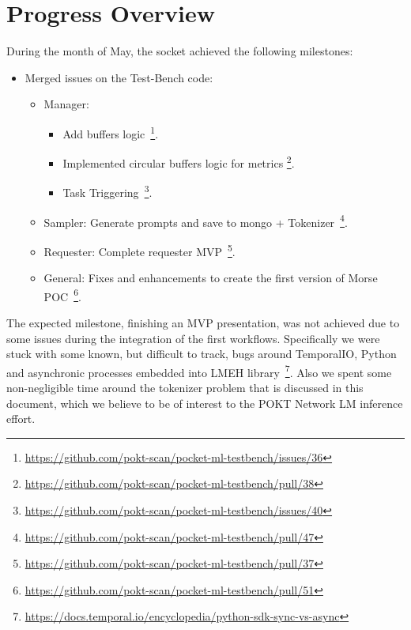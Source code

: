 \section{Progress Overview}\label{sec:a}

During the month of May, the socket achieved the following milestones:

\begin{itemize}\setlength\itemsep{2mm}
    \item Merged issues on the Test-Bench code:
    \begin{itemize}
        \item Manager:
            \begin{itemize}
                \item Add buffers logic~\footnote{\url{https://github.com/pokt-scan/pocket-ml-testbench/issues/36}}.
                \item Implemented circular buffers logic for metrics \footnote{\url{https://github.com/pokt-scan/pocket-ml-testbench/pull/38}}.
                \item Task Triggering~\footnote{\url{https://github.com/pokt-scan/pocket-ml-testbench/issues/40}}.
            \end{itemize}
        \item Sampler: Generate prompts and save to mongo + Tokenizer~\footnote{\url{https://github.com/pokt-scan/pocket-ml-testbench/pull/47}}.
        \item Requester: Complete requester MVP~\footnote{\url{https://github.com/pokt-scan/pocket-ml-testbench/pull/37}}.
        \item General: Fixes and enhancements to create the first version of Morse POC~\footnote{\url{https://github.com/pokt-scan/pocket-ml-testbench/pull/51}}.
    \end{itemize}
\end{itemize}

The expected milestone, finishing an MVP presentation, was not achieved due to some issues during the integration of the first workflows. Specifically we were stuck with some known, but difficult to track, bugs around TemporalIO, Python and asynchronic processes embedded into \gls{LMEH} library~\footnote{\url{https://docs.temporal.io/encyclopedia/python-sdk-sync-vs-async}}. Also we spent some non-negligible time around the tokenizer problem that is discussed in this document, which we believe to be of interest to the POKT Network \gls{LM} inference effort.